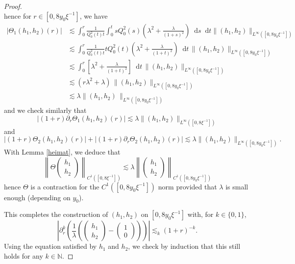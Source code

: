 \documentclass[10pt,a4paper]{amsart}
\newcommand{\dd}{\mathop{}\!\mathrm{d}}
\begin{document}
\begin{proof}
\[  \]
  hence for $r \in [0, 8  y_0\xi^{- 1}]$, we have
  \begin{align*}
| \Theta_1 (h_1, h_2) (r) | & \lesssim \int_0^r \frac{1}{Q_0^2 (t) t} \int_0^t s Q_0^2 (s) \left(
    \lambda^2 + \frac{\lambda}{(1 + s)^2} \right) \dd s \dd t \| (h_1, h_2)
    \|_{L^{\infty} ([0, 8  y_0\xi^{- 1}])}\\
    & \lesssim \int_0^r \frac{1}{Q_0^2 (t) t} t Q_0^2 (t) \left( \lambda^2
    + \frac{\lambda}{(1 + t)^2} \right)\dd t \, \| (h_1, h_2) \|_{L^{\infty} ([0,
    8 y_0 \xi^{- 1}])}\\
    & \lesssim \int_0^r \left[ \lambda^2 + \frac{\lambda}{(1 + t)^2} \right] \dd t \, \| (h_1,
    h_2) \|_{L^{\infty} ([0, 8 y_0 \xi^{- 1}])}\\
    & \lesssim (r \lambda^2 + \lambda) \, \| (h_1, h_2) \|_{L^{\infty} ([0, 8 y_0
    \xi^{- 1}])}\\
    & \lesssim \lambda \| (h_1, h_2)\, \|_{L^{\infty} ([0, 8 y_0 \xi^{- 1}])}
  \end{align*}
  and we check similarly that
  \[ | (1 + r) \partial_r \Theta_1 (h_1, h_2) (r) | \lesssim \lambda\| (h_1, h_2)
     \|_{L^{\infty} ([0, 8 \xi^{- 1}])} \]
and
  \[ | (1 + r) \Theta_2 (h_1, h_2) (r) | + | (1 + r) \partial_r \Theta_2 (h_1,
     h_2) (r) | \lesssim \lambda \| (h_1, h_2) \|_{L^{\infty} ([0, 8 y_0 \xi^{-
     1}])} . \]
  With Lemma \ref{heimat}, we deduce that
  \[ \left\| \Theta \left(\begin{array}{c}
       h_1\\
       h_2
     \end{array}\right) \right\|_{C^1 ([0, 8 \xi^{- 1}])} \lesssim \lambda
     \left\| \left(\begin{array}{c}
       h_1\\
       h_2
     \end{array}\right) \right\|_{C^1 ([0, 8 y_0 \xi^{- 1}])} \]
  hence $\Theta$ is a contraction for the $C^1 ([0, 8 y_0 \xi^{- 1}])$ norm
  provided that $\lambda$ is small enough (depending on $y_0$).
  
  This completes the construction of $(h_1, h_2)$ on $[0, 8 y_0 \xi^{- 1}]$ with,
  for $k \in \{ 0, 1 \}$,
  \[ \left| \partial_r^k \left( \frac{1}{\lambda}\left( \left(\begin{array}{c}
       h_1\\
       h_2
     \end{array}\right) - \left(\begin{array}{c}
       1\\
       0
     \end{array}\right)\right)\right) \right| \lesssim_k (1 + r)^{- k} .
  \]
  Using the equation satisfied by $h_1$ and $h_2$, we check by induction that
  this still holds for any $k \in \mathbb{N}$.
  

\end{proof}
\end{document}
